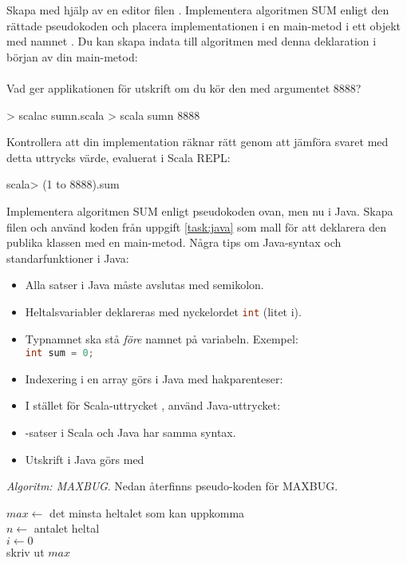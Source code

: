 \Subtask Skapa med hjälp av en editor filen . Implementera algoritmen SUM enligt den rättade pseudokoden och placera implementationen i en main-metod i ett objekt med namnet . Du kan skapa indata  till algoritmen med denna deklaration i början av din main-metod: \\  \\ Vad ger applikationen för utskrift om du kör den med argumentet 8888? 

\begin{REPL}
> scalac sumn.scala
> scala sumn 8888
\end{REPL}

\Subtask Kontrollera att din implementation räknar rätt genom att jämföra svaret med detta uttrycks värde, evaluerat i Scala REPL:
\begin{REPL}
scala> (1 to 8888).sum
\end{REPL}

\Subtask Implementera algoritmen SUM enligt pseudokoden ovan, men nu i Java. Skapa filen  och använd koden från uppgift \ref{task:java} som mall för att deklarera den publika klassen  med en main-metod. Några tips om Java-syntax och standarfunktioner i Java: 

\begin{itemize}[noitemsep, nolistsep]
\item Alla satser i Java måste avslutas med semikolon.
\item Heltalsvariabler deklareras med nyckelordet \lstinline[language=Java]{int} (litet i). 
\item Typnamnet ska stå \emph{före} namnet på variabeln. Exempel: \\ \lstinline[language=Java]{int sum = 0;}
\item Indexering i en array görs i Java med hakparenteser: 
\item I stället för Scala-uttrycket , använd Java-uttrycket: \\ 
\item {}-satser i Scala och Java har samma syntax.
\item Utskrift i Java görs med 
\end{itemize}


\Task \emph{Algoritm: MAXBUG}. Nedan återfinns pseudo-koden för MAXBUG. 

\begin{algorithm}[H]
 
 $max \leftarrow$ det minsta heltalet som kan uppkomma  \\
 $n \leftarrow $ antalet heltal \\
 $i \leftarrow 0$ \\
 skriv ut $max$
\end{algorithm}

